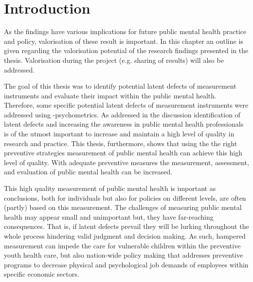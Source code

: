 \section*{Introduction}
As the findings have various implications for future public mental health practice and policy, valorisation of these result is important. In this chapter an outline is given regarding the valorisation potential of the research findings presented in the thesis. Valorisation during the project (e.g. sharing of results) will also be addressed.

The goal of this thesis was to identify potential latent defects of measurement instruments and evaluate their impact within the public mental health. Therefore, some specific potential latent defects of measurement instruments were addressed using \textbeta-psychometrics. 
As addressed in the discussion identification of latent defects and increasing the awareness in public mental health professionals is of the utmost important to increase and maintain a high level of quality in research and practice. This thesis, furthermore, shows that using the the right preventive strategies measurement of public mental health can achieve this high level of quality. With adequate preventive measures the measurement, assessment, and evaluation of public mental health can be increased.

This high quality measurement of public mental health is important as conclusions, both for individuals but also for policies on different levels, are often (partly) based on this measurement. The challenges of measuring public mental health may appear small and unimportant but, they have far-reaching consequences. That is, if latent defects prevail they will be lurking throughout the whole process hindering valid judgment and decision making. As such, hampered measurement can impede the care for vulnerable children within the preventive youth health care, but also nation-wide policy making that addresses preventive programs to decrease physical and psychological job demands of employees within specific economic sectors. 

